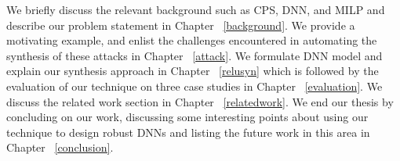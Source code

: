 We briefly discuss the relevant background such as \ac{CPS}, \ac{DNN}, and \ac{MILP} and describe our problem statement in Chapter ~\ref{background}.
We provide a motivating example, and enlist the challenges encountered in automating the synthesis of these attacks in Chapter ~\ref{attack}.
We formulate \ac{DNN} model and explain our synthesis approach in Chapter ~\ref{relusyn} which is followed by the evaluation of our technique on three case studies in Chapter ~\ref{evaluation}.
We discuss the related work section in Chapter ~\ref{relatedwork}.
We end our thesis by concluding on our work, discussing some interesting points about using our technique to design robust \ac{DNN}s and listing the future work in this area in Chapter ~\ref{conclusion}.










